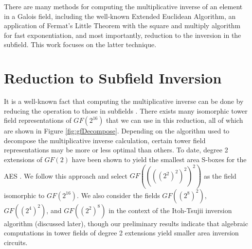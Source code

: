 
There are many methods for computing the multiplicative inverse of an element in a Galois field, including the well-known Extended Euclidean Algorithm, an application of Fermat's Little Theorem with the square and multiply algorithm for fast exponentiation, and most importantly, reduction to the inversion in the subfield. This work focuses on the latter technique. 

\section{Reduction to Subfield Inversion}
It is a well-known fact that computing the multiplicative inverse can be done by reducing the operation to those in subfields \cite{Itoh88-1, Paar95-1, Rijmen00-1}. There exists many isomorphic tower field representations of $GF(2^{16})$ that we can use in this reduction, all of which are shown in Figure \ref{fig:gfDecompose}. Depending on the algorithm used to decompose the multiplicative inverse calculation, certain tower field representations may be more or less optimal than others. To date, degree 2 extensions of $GF(2)$ have been shown to yield the smallest area S-boxes for the AES \cite{Canright05-1, Satoh01-1, Mentens05-1, Boyar11-1}. We follow this approach and select $GF((((2^2)^2)^2)^2)$ as the field isomorphic to $GF(2^{16})$. We also consider the fields $GF((2^8)^2)$, $GF((2^4)^2)$, and $GF((2^2)^8)$ in the context of the Itoh-Tsujii inversion algorithm (discussed later), though our preliminary results indicate that algebraic computations in tower fields of degree 2 extensions yield smaller area inversion circuits. 

